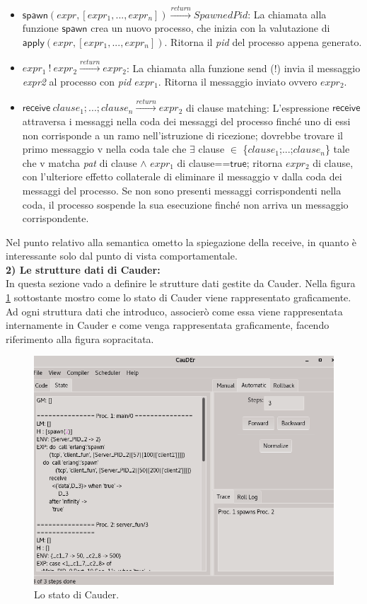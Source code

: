 \documentclass[background.tex]{subfiles}
\begin{document}
\begin{itemize}
	\item $\displaystyle \mathsf{spawn}(expr,[expr_{1},...,expr_{n}])\xrightarrow{return}SpawnedPid$: La chiamata alla funzione $\mathsf{spawn}$ crea un nuovo processo, che inizia con la valutazione di $\displaystyle \mathsf{apply}(expr,[expr_{1},...,expr_{n}])$. Ritorna il \textit{pid} del processo appena generato.
	\item $\displaystyle expr_{1}~!~expr_{2}\xrightarrow{return}expr_{2}$: La chiamata alla funzione send (!) invia il messaggio \textit{expr2} al processo con \textit{pid $expr_{1}$}. Ritorna il messaggio inviato ovvero \textit{$expr_{2}$}.
	\item $\displaystyle \mathsf{receive}~clause_{1};...;clause_{n}\xrightarrow{return}expr_{2}$ di clause matching: L'espressione $\mathsf{receive}$ attraversa i messaggi nella coda dei messaggi del processo finché uno di essi non corrisponde a un ramo nell'istruzione di ricezione; dovrebbe trovare il primo messaggio v nella coda tale che $\exists$ clause $\in$ \{$clause_{1}$;...;$clause_{n}$\} tale che v matcha \textit{pat} di clause $\wedge$ \textit{$expr_{1}$} di clause==$\mathsf{true}$; ritorna \textit{$expr_{2}$} di clause, con l'ulteriore effetto collaterale di eliminare il messaggio v dalla coda dei messaggi del processo. Se non sono presenti messaggi corrispondenti nella coda, il processo sospende la sua esecuzione finché non arriva un messaggio corrispondente.
\end{itemize}
Nel punto relativo alla semantica ometto la spiegazione della receive, in quanto è interessante solo dal punto di vista comportamentale.\\
\textbf{2) Le strutture dati di Cauder:}\\
In questa sezione vado a definire le strutture dati gestite da Cauder.
Nella figura \ref{fig3} sottostante mostro come lo stato di Cauder viene rappresentato graficamente.
Ad ogni struttura dati che introduco, associerò come essa viene rappresentata internamente in Cauder e come venga rappresentata graficamente, facendo riferimento alla figura sopracitata.
\begin{figure}[!ht]
	\centerline{\includegraphics[scale=0.5]{./Background/Cauder/Imgs/CauderStato}}
	\caption{Lo stato di Cauder.}
	\label{fig3}
\end{figure}
\end{document}
